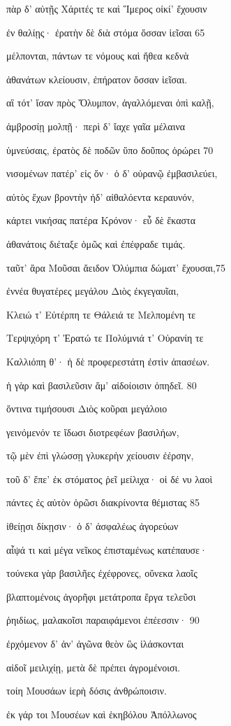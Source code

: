 πὰρ δ' αὐτῇς Χάριτές τε καὶ Ἵμερος οἰκί' ἔχουσιν

ἐν θαλίῃς· ἐρατὴν δὲ διὰ στόμα ὄσσαν ἱεῖσαι 65 

μέλπονται, πάντων τε νόμους καὶ ἤθεα κεδνὰ 

ἀθανάτων κλείουσιν, ἐπήρατον ὄσσαν ἱεῖσαι.

αἳ τότ' ἴσαν πρὸς Ὄλυμπον, ἀγαλλόμεναι ὀπὶ καλῇ, 

ἀμβροσίῃ μολπῇ· περὶ δ' ἴαχε γαῖα μέλαινα 

ὑμνεύσαις, ἐρατὸς δὲ ποδῶν ὕπο δοῦπος ὀρώρει 70

νισομένων πατέρ' εἰς ὅν· ὁ δ' οὐρανῷ ἐμβασιλεύει, 

αὐτὸς ἔχων βροντὴν ἠδ' αἰθαλόεντα κεραυνόν,

κάρτει νικήσας πατέρα Κρόνον· εὖ δὲ ἕκαστα 

ἀθανάτοις διέταξε ὁμῶς καὶ ἐπέφραδε τιμάς.

ταῦτ' ἄρα Μοῦσαι ἄειδον Ὀλύμπια δώματ' ἔχουσαι,75 

ἐννέα θυγατέρες μεγάλου Διὸς ἐκγεγαυῖαι,

Κλειώ τ' Εὐτέρπη τε Θάλειά τε Μελπομένη τε

Τερψιχόρη τ' Ἐρατώ τε Πολύμνιά τ' Οὐρανίη τε

Καλλιόπη θ'· ἡ δὲ προφερεστάτη ἐστὶν ἁπασέων. 

ἡ γὰρ καὶ βασιλεῦσιν ἅμ' αἰδοίοισιν ὀπηδεῖ. 80 

ὅντινα τιμήσουσι Διὸς κοῦραι μεγάλοιο

γεινόμενόν τε ἴδωσι διοτρεφέων βασιλήων,

τῷ μὲν ἐπὶ γλώσσῃ γλυκερὴν χείουσιν ἐέρσην,

τοῦ δ' ἔπε' ἐκ στόματος ῥεῖ μείλιχα· οἱ δέ νυ λαοὶ 

πάντες ἐς αὐτὸν ὁρῶσι διακρίνοντα θέμιστας 85

ἰθείῃσι δίκῃσιν· ὁ δ' ἀσφαλέως ἀγορεύων

αἶψά τι καὶ μέγα νεῖκος ἐπισταμένως κατέπαυσε· 

τούνεκα γὰρ βασιλῆες ἐχέφρονες, οὕνεκα λαοῖς 

βλαπτομένοις ἀγορῆφι μετάτροπα ἔργα τελεῦσι

ῥηιδίως, μαλακοῖσι παραιφάμενοι ἐπέεσσιν· 90 

ἐρχόμενον δ' ἀν' ἀγῶνα θεὸν ὣς ἱλάσκονται

αἰδοῖ μειλιχίῃ, μετὰ δὲ πρέπει ἀγρομένοισι. 

τοίη Μουσάων ἱερὴ δόσις ἀνθρώποισιν.

ἐκ γάρ τοι Μουσέων καὶ ἑκηβόλου Ἀπόλλωνος

